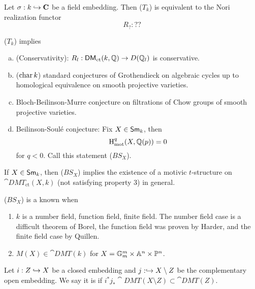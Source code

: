 \begin{proposition}
Let $\sigma:k\hookrightarrow \mathbf{C}$ be a field embedding. Then ($T_k$) is equivalent to the Nori
realization functor
\[
R_{?} : ??
\]
\end{proposition}
\begin{theorem}
($T_k$) implies
\begin{enumerate}[a)]
\item (Conservativity): $R_l:\cat{DM}_{\text{ct}}(k,\Q)\to D(\Q_l)$ is conservative.
\item ($\operatorname{char} k$) standard conjectures of Grothendieck on algebraic cycles up to
homological equivalence on smooth projective varieties.
\item Bloch-Beilinson-Murre conjecture on filtrations of Chow groups of smooth projective varieties.
\item Beilinson-Soul\'e conjecture: Fix $X\in \mathsf{Sm}_k$, then
\[
\mathrm{H}_{\text{mot}}^{q}(X,\mathbb Q(p)) = 0
\]
for $q<0$. Call this statement ($BS_X$).
\end{enumerate}
\end{theorem}
\begin{theorem}[Levine]
If $X\in \mathsf{Sm}_k$, then ($BS_X$) implies the existence of a motivic $t$-structure on
$\cat{DMT}_{\text{ct}}(X,k)$ (not satisfying property 3) in general.
\end{theorem}
\begin{theorem}
($BS_X$) is a known when
\begin{enumerate}[1)]
\item $k$ is a number field, function field, finite field. The number field case is a
difficult theorem of Borel, the function field was proven by Harder, and the finite field
case by Quillen.
\item $M(X)\in \cat{DMT}(k)$ for $X=\mathbb{G}_m^{m}\times \mathbb A^{n}\times \mathbb{P}^{n}$.
\end{enumerate}
\end{theorem}
\begin{definition}
Let $i:Z\hookrightarrow X$ be a closed embedding and $j:\hookrightarrow X\setminus Z$ be the complementary
open embedding. We say it is  if $i^{*}j_*\cat{DMT}(X\setminus
Z)\subset \cat{DMT}(Z)$.
\end{definition}

\printbibliography


